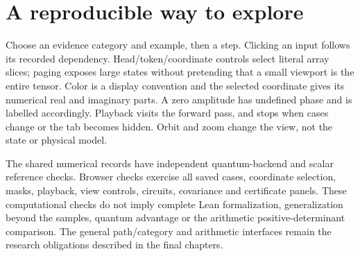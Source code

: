 \section{A reproducible way to explore}
Choose an evidence category and example, then a step. Clicking an input
follows its recorded dependency. Head/token/coordinate controls select
literal array slices; paging exposes large states without pretending that a
small viewport is the entire tensor. Color is a display convention and the
selected coordinate gives its numerical real and imaginary parts. A zero
amplitude has undefined phase and is labelled accordingly. Playback visits
the forward pass, and stops when cases change or the tab becomes hidden.
Orbit and zoom change the view, not the state or physical model.

The shared numerical records have independent quantum-backend and scalar
reference checks. Browser checks exercise all saved cases, coordinate
selection, masks, playback, view controls, circuits, covariance and certificate
panels. These computational checks do not imply complete Lean formalization,
generalization beyond the samples, quantum advantage or the arithmetic
positive-determinant comparison. The general path/category and arithmetic
interfaces remain the research obligations described in the final chapters.


